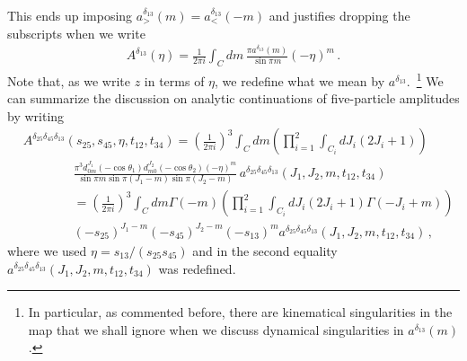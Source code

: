 This ends up imposing $a_{>}^{\delta_{13}}(m)=a_{<}^{\delta_{13}}(-m)$ and justifies dropping the subscripts when we write
\begin{align}
  A^{\delta_{13}}(\eta)=\frac{1}{2\pi i}\int_{C}dm\,\frac{\pi a^{\delta_{13}}(m)}{\sin \pi m}(-\eta)^m\,.
\end{align}
Note that, as we write $z$ in terms of $\eta$, we redefine what we mean by $a^{\delta_{13}}$.~\footnote{In particular, as commented before, there are kinematical singularities in the map that we shall ignore when we discuss dynamical singularities in $a^{\delta_{13}}(m)$.}
We can summarize the discussion on analytic continuations of five-particle amplitudes by writing
\begin{align}
  \label{eq:5ptreggeamplitude}
   & A^{\delta_{25}\delta_{45}\delta_{13}}(s_{25}, s_{45},\eta, t_{12}, t_{34})=\left(\frac{1}{2\pi i}\right)^{3}\int_C dm \left(  \prod_{i=1}^2   \int_{C_i} dJ_i  (2J_i+1)\right) \nonumber                 \\
   & \qquad\qquad \frac{\pi^3 d_{0 m}^{J_1}(-\cos\theta_1)d_{m 0}^{J_2}(-\cos\theta_2)(-\eta)^{m}}{\sin \pi m\sin \pi (J_1-m)\sin \pi(J_2-m)} \,a^{\delta_{25}\delta_{45}\delta_{13}}(J_1,J_2, m,t_{12},t_{34}) \nonumber \\
   & \qquad\qquad=\left(\frac{1}{2\pi i}\right)^{3}\int_C dm   \Gamma(-m)    \left(  \prod_{i=1}^2   \int_{C_i} dJ_i  (2J_i+1)\Gamma(-J_i+m) \right)                                                          \\
   & \qquad\qquad (-s_{25})^{J_1-m}(-s_{45})^{J_2-m}(-s_{13})^{m}a^{\delta_{25}\delta_{45}\delta_{13}}(J_1,J_2, m,t_{12},t_{34})\,,\nonumber
\end{align}
where we used $\eta=s_{13}/(s_{25}s_{45})$ and
in the second equality $a^{\delta_{25}\delta_{45}\delta_{13}}(J_1,J_2, m,t_{12},t_{34})$ was redefined.

